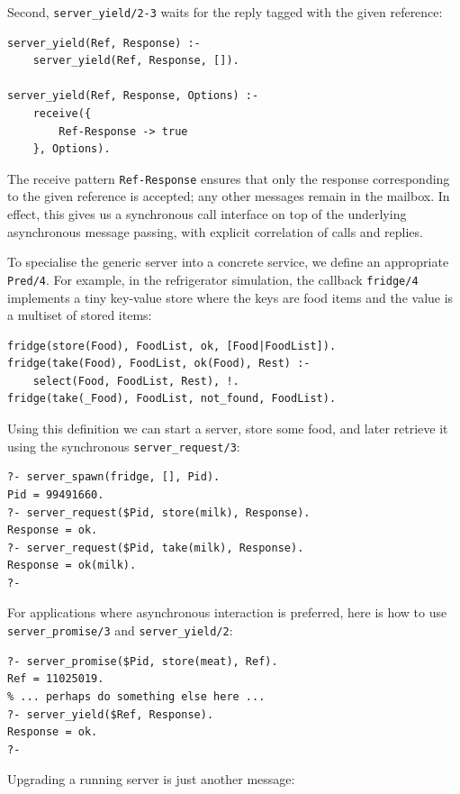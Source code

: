 Second, \texttt{server\_yield/2-3} waits for the reply tagged with the given reference:

\begin{verbatim}
server_yield(Ref, Response) :-
    server_yield(Ref, Response, []).

server_yield(Ref, Response, Options) :-
    receive({
        Ref-Response -> true
    }, Options).
\end{verbatim}

\noindent The receive pattern \texttt{Ref-Response} ensures that only the response corresponding to the given reference is accepted; any other messages remain in the mailbox. In effect, this gives us a synchronous call interface on top of the underlying asynchronous message passing, with explicit correlation of calls and replies.

To specialise the generic server into a concrete service, we define an appropriate \texttt{Pred/4}. For example, in the refrigerator simulation, the callback \texttt{fridge/4} implements a tiny key-value store where the keys are food items and the value is a multiset of stored items:

\begin{verbatim}
fridge(store(Food), FoodList, ok, [Food|FoodList]).
fridge(take(Food), FoodList, ok(Food), Rest) :-
    select(Food, FoodList, Rest), !.
fridge(take(_Food), FoodList, not_found, FoodList).
\end{verbatim}

\noindent Using this definition we can start a server, store some food, and later retrieve it using the synchronous \texttt{server\_request/3}:

\begin{verbatim}
?- server_spawn(fridge, [], Pid).
Pid = 99491660.
?- server_request($Pid, store(milk), Response).
Response = ok.
?- server_request($Pid, take(milk), Response).
Response = ok(milk).
?-
\end{verbatim}

\noindent For applications where asynchronous interaction is preferred, here is how to use \texttt{server\_promise/3} and \texttt{server\_yield/2}:

\begin{verbatim}
?- server_promise($Pid, store(meat), Ref).
Ref = 11025019.
% ... perhaps do something else here ...
?- server_yield($Ref, Response).
Response = ok.
?-
\end{verbatim}

\noindent Upgrading a running server is just another message:

